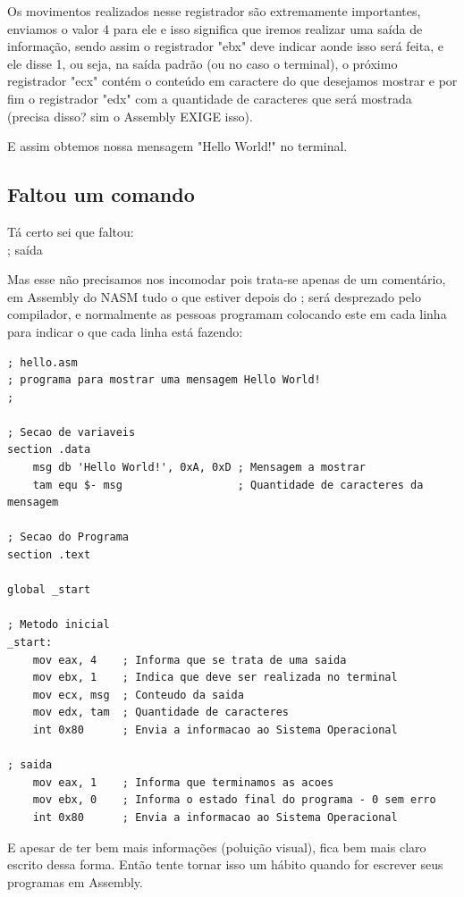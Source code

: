 Os movimentos realizados nesse registrador são extremamente importantes, enviamos o valor 4 para ele e isso significa que iremos realizar uma saída de informação, sendo assim o registrador "ebx" deve indicar aonde isso será feita, e ele disse 1, ou seja, na saída padrão (ou no caso o terminal), o próximo registrador "ecx" contém o conteúdo em caractere do que desejamos mostrar e por fim o registrador "edx" com a quantidade de caracteres que será mostrada (precisa disso? sim o Assembly EXIGE isso).

E assim obtemos nossa mensagem "Hello World!" no terminal.

\subsection{Faltou um comando}

Tá certo sei que faltou: \\
{\ttfamily ; saída}

Mas esse não precisamos nos incomodar pois trata-se apenas de um comentário, em Assembly do NASM tudo o que estiver depois do ; será desprezado pelo compilador, e normalmente as pessoas programam colocando este em cada linha para indicar o que cada linha está fazendo:
\begin{lstlisting}[]
; hello.asm
; programa para mostrar uma mensagem Hello World!
;

; Secao de variaveis
section .data
	msg db 'Hello World!', 0xA, 0xD ; Mensagem a mostrar
	tam equ $- msg                  ; Quantidade de caracteres da mensagem
	
; Secao do Programa	
section .text
	
global _start
	
; Metodo inicial	
_start:
	mov eax, 4    ; Informa que se trata de uma saida
	mov ebx, 1    ; Indica que deve ser realizada no terminal
	mov ecx, msg  ; Conteudo da saida
	mov edx, tam  ; Quantidade de caracteres
	int 0x80      ; Envia a informacao ao Sistema Operacional
	
; saida
	mov eax, 1    ; Informa que terminamos as acoes
	mov ebx, 0    ; Informa o estado final do programa - 0 sem erro
	int 0x80      ; Envia a informacao ao Sistema Operacional
\end{lstlisting}
 
E apesar de ter bem mais informações (poluição visual), fica bem mais claro escrito dessa forma. Então tente tornar isso um hábito quando for escrever seus programas em Assembly.

